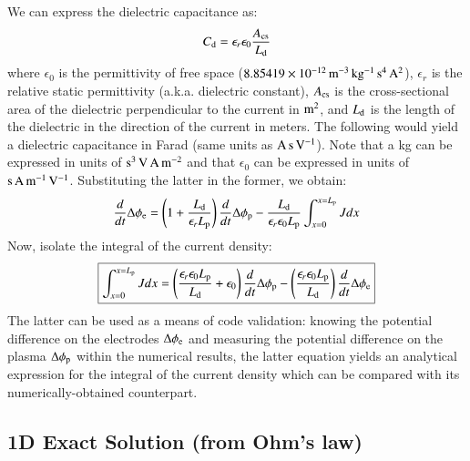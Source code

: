 \documentclass{warpdoc}
\newcommand\frameeqn[1]{\fbox{$\displaystyle #1$}}
\begin{document}
% 
We can express the dielectric capacitance as:
%
\begin{equation}
 C_{\rm d}=\epsilon_r \epsilon_0 \frac{A_{\rm cs}}{L_{\rm d}}
\end{equation}
%
where $\epsilon_0$ is the permittivity of free space ($\rm 8.85419 \times 10^{-12} \, m^{-3} \, kg^{-1} \, s^4 \, A^2$), $\epsilon_r$ is the relative static permittivity (a.k.a. dielectric constant), $A_{\rm cs}$ is the cross-sectional area of the dielectric perpendicular to the current in $\rm m^2$, and $L_{\rm d}$ is the length of the dielectric in the direction of the current in meters. The following would yield a dielectric capacitance in Farad (same units as $\rm A \, s \, V^{-1}$). Note that a kg can be expressed in units of $\rm s^3 \, V \, A \, m^{-2}$ and that $\epsilon_0$ can be expressed in units of $\rm s \, A \, m^{-1} \, V^{-1}$. Substituting the latter in the former, we obtain:
%
\begin{equation}
\frac{d}{d t}\Delta \phi_{\rm e} = \left(1+\frac{ L_{\rm d}}{\epsilon_r  L_{\rm p}} \right)\frac{d}{d t}\Delta \phi_{\rm p}- \frac{L_{\rm d}}{\epsilon_r \epsilon_0  L_{\rm p}}\int_{x=0}^{x=L_{\rm p}}  J dx  
\end{equation}
% 
Now, isolate the integral of the current density:
%
\begin{equation}
\frameeqn{
 \int_{x=0}^{x=L_{\rm p}}  J dx  
=
 \left(\frac{\epsilon_r \epsilon_0  L_{\rm p}}{L_{\rm d}} +\epsilon_0   \right)\frac{d}{d t}\Delta \phi_{\rm p} 
-\left( \frac{\epsilon_r \epsilon_0  L_{\rm p}}{L_{\rm d}} \right)\frac{d}{d t}\Delta \phi_{\rm e} 
}
\end{equation}
% 
The latter can be used as a means of code validation: knowing the potential difference on the electrodes $\Delta \phi_{\rm e}$ and measuring the potential difference on the plasma $\Delta \phi_{\rm p}$ within the numerical results, the latter equation yields an analytical expression for the integral of the current density which can be compared with its numerically-obtained counterpart.    


\subsection{1D Exact Solution (from Ohm's law)}
\end{document}
